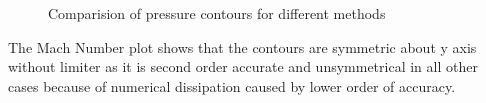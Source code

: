 \documentclass[12pt]{elsarticle}
\begin{document}
\begin{figure}[ht]
		\caption{Comparision of pressure contours for different methods}
		\label{figure5}
	\end{figure}
	
	The Mach Number plot shows that the contours are symmetric about y axis without limiter as it is second order accurate and unsymmetrical in all other cases because of numerical dissipation caused by lower order of accuracy.
	
\end{document}
